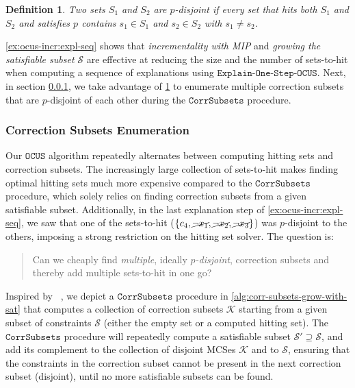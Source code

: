 \documentclass[twoside,11pt]{article}
\newcommand\citet[1]{\citeauthor{#1}~\citeyear{#1}}
\newcommand\m[1]{\mathcal{#1}}
\newtheorem{definition}[thm]{Definition}
\newcommand\mm[1]{\ensuremath{#1}\xspace}
\newcommand\call[1]{\mm{\texttt{#1}}}
\newcommand\comus{\mm{\call{OCUS}}}
\newcommand\corrsubsets{\mm{\call{CorrSubsets}}}
\newcommand\onestepo{\ensuremath{\call{Explain-One-Step-OCUS}}\xspace}
\begin{document}
\begin{definition}\label{prop:p-disjoint}
	Two sets $S_1$ and $S_2$ are $p$-disjoint if every set that hits both $S_1$ and $S_2$ and satisfies $p$ contains $s_1\in S_1$ and $s_2\in S_2$ with $s_1 \neq s_2$.
\end{definition}

\cref{ex:ocus-incr:expl-seq} shows that \emph{incrementality with MIP} and \emph{growing the satisfiable subset} $\m{S}$ are effective at reducing the size and the number of sets-to-hit when computing a sequence of explanations using \onestepo. 
Next, in section \ref{sec:correction_subset_enum}, we take advantage of \cref{prop:p-disjoint} to enumerate multiple correction subsets that are $p$-disjoint of each other during the \corrsubsets procedure.

\subsubsection{Correction Subsets Enumeration}\label{sec:correction_subset_enum}

Our \comus algorithm repeatedly alternates between computing hitting sets and correction subsets. 
The increasingly large collection of sets-to-hit makes finding optimal hitting sets much more expensive compared to the \corrsubsets procedure, which solely relies on finding correction subsets from a given satisfiable subset.
Additionally, in the last explanation step of \cref{ex:ocus-incr:expl-seq}, we saw that one of the sets-to-hit ($\{c_4, \cancel{\lnot x_1} ,\cancel{\lnot x_2} , \cancel{\lnot x_3}\}$) was $p$-disjoint to the others, imposing a strong restriction on the hitting set solver. 
The question is: 
\begin{quote}
Can we cheaply find \textit{multiple}, ideally \emph{$p$-disjoint}, correction subsets and thereby add multiple sets-to-hit in one go?
\end{quote}

Inspired by \citet{marques2013computing}, we depict a \corrsubsets procedure
in \cref{alg:corr-subsets-grow-with-sat} that computes a collection of correction subsets $\m{K}$ starting from a given subset of constraints $\m{S}$ (either the empty set or a computed hitting set). 
The \corrsubsets procedure will repeatedly compute a satisfiable subset $\m{S}' \supseteq \m{S}$, and add its complement 
to the collection of disjoint MCSes $\m{K}$ and to $\m{S}$, ensuring that the constraints in the correction subset cannot be present in the next correction subset (disjoint), until no more satisfiable subsets can be found. 
\end{document}
